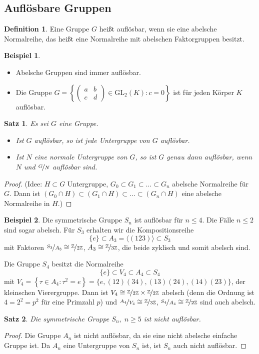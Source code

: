 \documentclass[12pt]{scrartcl}%
\newtheorem{thm}{Satz}
\theoremstyle{definition}
\newtheorem*{defn}{Definition}
\newtheorem{ex}{Beispiel}
\theoremstyle{remark}
\begin{document}
\subsection{Auflösbare Gruppen}

\begin{defn}
    Eine Gruppe $G$ heißt auflösbar, wenn sie eine abelsche Normalreihe, das heißt eine Normalreihe mit abelschen Faktorgruppen besitzt.
\end{defn}

\begin{ex}
    \begin{itemize}
        \item Abelsche Gruppen sind immer auflösbar.
        \item Die Gruppe $G=\left\{\begin{pmatrix}
            a & b \\
            c & d \end{pmatrix} \in \text{GL}_2(K):c=0\right\}$ ist für jeden Körper $K$ auflösbar.
    \end{itemize}
\end{ex}

\begin{thm}
    Es sei $G$ eine Gruppe.
    \begin{itemize}
        \item Ist $G$ auflösbar, so ist jede Untergruppe von $G$ auflösbar.
        \item Ist $N$ eine normale Untergruppe von $G$, so ist $G$ genau dann auflösbar, wenn $N$ und $\nicefrac{G}{N}$ auflösbar sind.
    \end{itemize}
\end{thm}

\begin{proof}
    (Idee: $H\subset G$ Untergruppe, $G_0\subset G_1\subset\dots\subset G_n$ abelsche Normalreihe für $G$. Dann ist $(G_0\cap H)\subset(G_1\cap H)\subset\dots\subset(G_n\cap H)$ eine abelsche Normalreihe in $H$.)
\end{proof}

\begin{ex}
Die symmetrische Gruppe $S_n$ ist auflösbar für $n\leq 4$. Die Fälle $n\leq 2$ sind sogar abelsch. Für $S_3$ erhalten wir die Kompositionsreihe
        \[\{e\}\subset A_3=\langle(123)\rangle\subset S_3\]
    mit Faktoren $\nicefrac{S_3}{A_3}\cong\nicefrac{\mathbb{Z}}{2\mathbb{Z}}$, $A_3\cong\nicefrac{\mathbb{Z}}{3\mathbb{Z}}$, die beide zyklisch und somit abelsch sind.
    
    Die Gruppe $S_4$ besitzt die Normalreihe
        \[\{e\}\subset V_4\subset A_4\subset S_4\]
    mit $V_4=\left\{\tau\in A_4:\tau^2=e\right\}=\{e,(12)(34),(13)(24),(14)(23)\}$, der kleinschen Vierergruppe. Dann ist $V_4\cong\nicefrac{\mathbb{Z}}{2\mathbb{Z}}\times\nicefrac{\mathbb{Z}}{2\mathbb{Z}}$ abelsch (denn die Ordnung ist $4=2^2=p^2$ für eine Primzahl $p$) und $\nicefrac{A_4}{V_4}\cong\nicefrac{\mathbb{Z}}{3\mathbb{Z}}$, $\nicefrac{S_4}{A_4}\cong\nicefrac{\mathbb{Z}}{2\mathbb{Z}}$ sind auch abelsch.
\end{ex}

\begin{thm}
    Die symmetrische Gruppe $S_n,\;n\geq 5$ ist nicht auflösbar.
\end{thm}

\begin{proof}
    Die Gruppe $A_n$ ist nicht auflösbar, da sie eine nicht abelsche einfache Gruppe ist. Da $A_n$ eine Untergruppe von $S_n$ ist, ist $S_n$ auch nicht auflösbar.
\end{proof}
\end{document}
